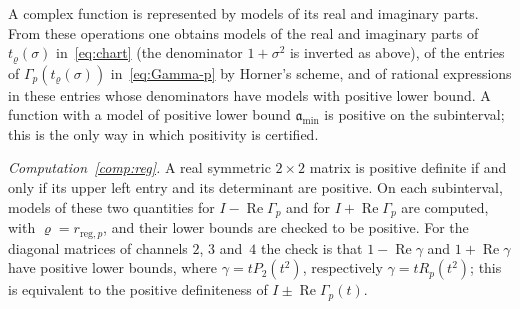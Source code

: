 \documentclass[11pt,reqno]{amsart}
\theoremstyle{definition}
\numberwithin{equation}{section}
\DeclareMathOperator{\RePart}{Re}
\begin{document}
A complex function is represented by models of its real and imaginary parts. From these operations one obtains models of the real and imaginary parts of $t_\varrho(\sigma)$ in~\eqref{eq:chart} (the denominator $1+\sigma^2$ is inverted as above), of the entries of $\Gamma_p(t_\varrho(\sigma))$ in~\eqref{eq:Gamma-p} by Horner's scheme, and of rational expressions in these entries whose denominators have models with positive lower bound. A function with a model of positive lower bound $\mathfrak{a}_{\min}$ is positive on the subinterval; this is the only way in which positivity is certified.

\emph{Computation~\ref{comp:reg}.} A real symmetric $2\times2$ matrix is positive definite if and only if its upper left entry and its determinant are positive. On each subinterval, models of these two quantities for $I-\RePart\Gamma_p$ and for $I+\RePart\Gamma_p$ are computed, with $\varrho=r_{\mathrm{reg},p}$, and their lower bounds are checked to be positive. For the diagonal matrices of channels $2$, $3$ and~$4$ the check is that $1-\RePart\gamma$ and $1+\RePart\gamma$ have positive lower bounds, where $\gamma=tP_2(t^2)$, respectively $\gamma=tR_p(t^2)$; this is equivalent to the positive definiteness of $I\pm\RePart\Gamma_p(t)$.
\end{document}
